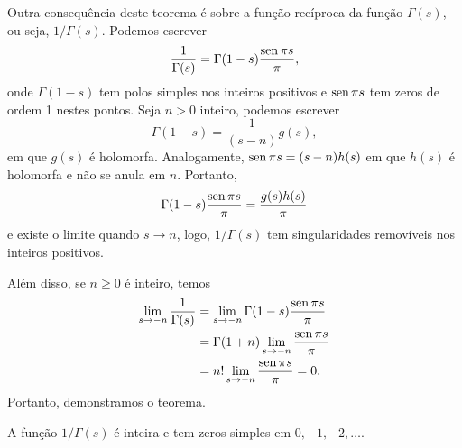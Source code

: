     Outra consequência deste teorema é sobre a função recíproca da função $\Gamma(s)$, ou seja, $1/\Gamma(s)$. Podemos escrever
    $$\frac{1}{\Gamma(s)} = \Gamma(1-s) \frac{\operatorname{sen} \pi s}{\pi},$$
    onde $\Gamma(1-s)$ tem polos simples nos inteiros positivos e $\operatorname{sen} \pi s$ tem zeros de ordem 1 nestes pontos. Seja $n>0$ inteiro, podemos escrever 
    $$\Gamma(1-s) = \frac{1}{(s-n)}g(s),$$
    em que $g(s)$ é holomorfa. Analogamente, $\operatorname{sen} \pi s = (s-n)h(s)$ em que $h(s)$ é holomorfa e não se anula em $n$. Portanto,
    $$ \Gamma(1-s) \frac{\operatorname{sen} \pi s}{\pi} = \frac{g(s)h(s)}{\pi} $$
    e existe o limite quando $s \to n$, logo, $1/\Gamma(s)$ tem singularidades removíveis nos inteiros positivos.
    
    Além disso, se $n \geq 0$ é inteiro, temos
    \begin{align*}
        \lim_{s \to -n} \frac{1}{\Gamma(s)} &=  \lim_{s \to -n} \Gamma(1-s) \frac{\operatorname{sen} \pi s}{\pi} \\
        &= \Gamma(1+n) \lim_{s \to -n} \frac{\operatorname{sen} \pi s}{\pi} \\
        &= n! \lim_{s \to -n} \frac{\operatorname{sen} \pi s}{\pi}  = 0.
    \end{align*}
    Portanto, demonstramos o teorema.
    \begin{teorema}
    A função $1/\Gamma(s)$ é inteira e tem zeros simples em $0,-1,-2, \dots$.
    \end{teorema}
    
    
    
    
    
    
    
    
    
    
    
